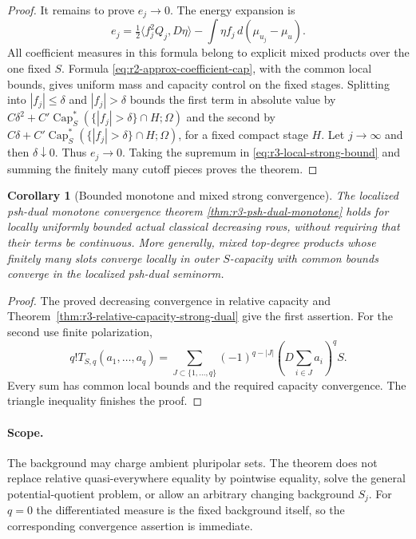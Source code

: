 \documentclass[11pt,a4paper]{article}
\numberwithin{equation}{section}
\newtheorem{corollary}[theorem]{Corollary}
\theoremstyle{definition}
\theoremstyle{remark}
\begin{document}
\begin{proof}
It remains to prove $e_j\to0$. The energy expansion is
\[
 e_j=\tfrac12\langle f_j^2Q_j,D\eta\rangle
                    -\int\eta f_j\,d(\mu_{u_j}-\mu_u).
\]
All coefficient measures in this formula belong to explicit mixed
products over the one fixed $S$. Formula
\eqref{eq:r2-approx-coefficient-cap}, with the common local bounds,
gives uniform mass and capacity control on the fixed stages.
Splitting into $|f_j|\leq\delta$ and $|f_j|>\delta$ bounds the first
term in absolute value by
$C\delta^2+C'\operatorname{Cap}_S^*(\{|f_j|>\delta\}\cap H;\Omega)$
and the second by
$C\delta+C'\operatorname{Cap}_S^*(\{|f_j|>\delta\}\cap H;\Omega)$,
for a fixed compact stage $H$. Let $j\to\infty$ and then
$\delta\downarrow0$. Thus $e_j\to0$.
Taking the supremum in \eqref{eq:r3-local-strong-bound} and summing
the finitely many cutoff pieces proves the theorem.
\end{proof}

\begin{corollary}[Bounded monotone and mixed strong convergence]
\label{cor:r3-bounded-mixed-strong-dual}
The localized psh-dual monotone convergence theorem
\ref{thm:r3-psh-dual-monotone} holds for locally uniformly bounded
actual classical decreasing rows, without requiring that their
terms be continuous. More generally, mixed top-degree products
whose finitely many slots converge locally in outer $S$-capacity
with common bounds converge in the localized psh-dual seminorm.
\end{corollary}

\begin{proof}
The proved decreasing convergence in relative capacity and
Theorem~\ref{thm:r3-relative-capacity-strong-dual} give the first
assertion. For the second use finite polarization,
\[
 q!T_{S,q}(a_1,\ldots,a_q)
 =\sum_{J\subset\{1,\ldots,q\}}(-1)^{q-|J|}
       \left(D\sum_{i\in J}a_i\right)^qS.
\]
Every sum has common local bounds and the required capacity
convergence. The triangle inequality finishes the proof.
\end{proof}

\paragraph{Scope.}
The background may charge ambient pluripolar sets. The theorem
does not replace relative quasi-everywhere equality by pointwise
equality, solve the general potential-quotient problem, or allow
an arbitrary changing background $S_j$. For $q=0$ the differentiated
measure is the fixed background itself, so the corresponding
convergence assertion is immediate.
\end{document}
